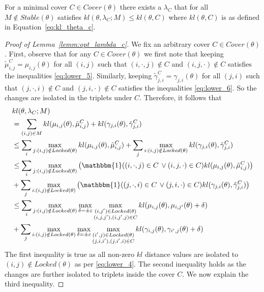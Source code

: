 \documentclass[10pt,a4paper]{amsart}
\begin{document}
\begin{lemma}\label{lemm:opt_lambda_c}
For a minimal cover $C \in Cover(\theta)$ there exists a $\lambda_C$ that for all $M \notin Stable(\theta)$  satisfies $kl(\theta, \lambda_C; M) \leq kl(\theta, C)$ where $kl(\theta, C)$ is as defined in Equation~\eqref{eq:kl_theta_c}.
\end{lemma}

\begin{proof}[Proof of Lemma~\ref{lemm:opt_lambda_c}]
We fix an arbitrary cover $C \in Cover(\theta)$. First, observe that for any $C \in Cover(\theta)$ we first note that keeping  $\tilde{\mu}^C_{i,j} = \mu_{i,j}(\theta)$ for all $(i,j)$ such that $(i, \cdot, j) \notin C$  and $(i, j, \cdot) \notin C$ satisfies the inequalities \eqref{eq:lower_5}. Similarly,  keeping $\tilde{\gamma}^C_{j,i} = \gamma_{j,i}(\theta)$ for all $(j,i)$ such that $(j, \cdot, i) \notin C$  and $(j, i, \cdot) \notin C$ satisfies the inequalities \eqref{eq:lower_6}. So the changes are isolated in the triplets under $C$. Therefore, it follows that 
\begin{align*}
&kl(\theta, \lambda_C; M) \\
&= \sum_{(i,j)\in M}kl(\mu_{i,j}(\theta), \tilde{\mu}^C_{i,j}) + kl(\gamma_{j,i}(\theta), \tilde{\gamma}^C_{j,i})\\
%
&\leq \sum_{i}\max_{j:(i,j)\notin Locked(\theta)} kl(\mu_{i,j}(\theta), \tilde{\mu}^C_{i,j}) + \sum_{j}\max_{i:(i,j)\notin Locked(\theta)} kl(\gamma_{j,i}(\theta), \tilde{\gamma}^C_{j,i})\\
%
&\leq \sum_{i}\max_{j:(i,j)\notin Locked(\theta)}\left(\mathbbm{1}((i,\cdot,j)\in C\, \vee (i,j, \cdot) \in C) kl(\mu_{i,j}(\theta), \tilde{\mu}^C_{i,j}) \right) \\
&+  \sum_{j}\max_{i:(i,j)\notin Locked(\theta)} \left(\mathbbm{1}((j,\cdot,i)\in C\, \vee (j, i, \cdot) \in C) kl(\gamma_{j,i}(\theta), \tilde{\gamma}^C_{j,i})\right)\\
%
&\leq \sum_{i}\max_{j:(i,j)\notin Locked(\theta)}\max_{\delta = \pm\varepsilon}\max_{\substack{(i,j')\in Locked(\theta)\\ (i,j,j'), (i, j', j)\in C}} kl(\mu_{i,j}(\theta), \mu_{i,j'}(\theta) + \delta) \\
&+ \sum_{j}\max_{i:(i,j)\notin Locked(\theta)} 
\max_{\delta = \pm\varepsilon}\max_{\substack{(i',j)\in Locked(\theta)\\ (j,i,i'), (j, i', i)\in C}} kl(\gamma_{i,j}(\theta), \gamma_{i',j}(\theta) + \delta)
\end{align*}
The first inequality is true as all non-zero $kl$ distance values are isolated to $(i,j) \notin Locked(\theta)$ as per \eqref{eq:lower_4}. The second inequality holds as the changes are further isolated to triplets inside the cover $C$. We now explain the third inequality. 

\end{proof}
\end{document}
